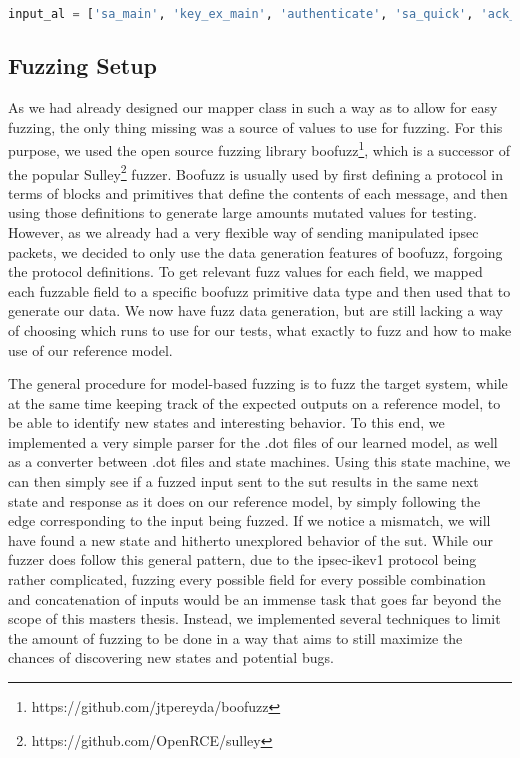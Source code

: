 \begin{lstlisting}[float=h, caption=The Updated Input Alphabet, label=lst:inputal_2, numbers=none, language=python]
	input_al = ['sa_main', 'key_ex_main', 'authenticate', 'sa_quick', 'ack_quick', 'sa_main_err', 'key_ex_main_err', 'authenticate_err', 'sa_quick_err', 'ack_quick_err']
\end{lstlisting}


\subsection{Fuzzing Setup} \label{subsec:fuzz_setup}
As we had already designed our mapper class in such a way as to allow for easy fuzzing, the only thing missing was a source of values to use for fuzzing. For this purpose, we used the open source fuzzing library boofuzz\footnote{https://github.com/jtpereyda/boofuzz}, which is a successor of the popular Sulley\footnote{https://github.com/OpenRCE/sulley} fuzzer. Boofuzz is usually used by first defining a protocol in terms of blocks and primitives that define the contents of each message, and then using those definitions to generate large amounts mutated values for testing. However, as we already had a very flexible way of sending manipulated \ac{ipsec} packets, we decided to only use the data generation features of boofuzz, forgoing the protocol definitions. To get relevant fuzz values for each field, we mapped each fuzzable field to a specific boofuzz primitive data type and then used that to generate our data. We now have fuzz data generation, but are still lacking a way of choosing which runs to use for our tests, what exactly to fuzz and how to make use of our reference model.

The general procedure for model-based fuzzing is to fuzz the target system, while at the same time keeping track of the expected outputs on a reference model, to be able to identify new states and interesting behavior. To this end, we implemented a very simple parser for the .dot files of our learned model, as well as a converter between .dot files and state machines. Using this state machine, we can then simply see if a fuzzed input sent to the \ac{sut} results in the same next state and response as it does on our reference model, by simply following the edge corresponding to the input being fuzzed. If we notice a mismatch, we will have found a new state and hitherto unexplored behavior of  the \ac{sut}. While our fuzzer does follow this general pattern, due to the \ac{ipsec}-\ac{ike}v1 protocol being rather complicated, fuzzing every possible field for every possible combination and concatenation of inputs would be an immense task that goes far beyond the scope of this masters thesis. Instead, we implemented several techniques to limit the amount of fuzzing to be done in a way that aims to still maximize the chances of discovering new states and potential bugs. 

